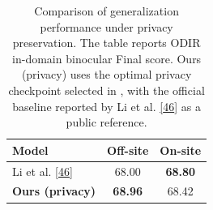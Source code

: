 \begin{table}[!htb]
\centering
\caption{Comparison of generalization performance under privacy preservation. The table reports ODIR in-domain binocular Final score. Ours (privacy) uses the optimal privacy checkpoint selected in , with the official baseline reported by Li et al. \hyperref[_Ref213949402]{{[}46{]}} as a public reference.}
\label{tab:privacy-final}
\begin{tabular}{lcc}
\toprule
Model & Off-site & On-site \\
\midrule
Li et al. \hyperref[_Ref213949402]{{[}46{]}} & 68.00 & \textbf{68.80} \\
\textbf{Ours (privacy)} & \textbf{68.96} & 68.42 \\
\bottomrule
\end{tabular}
\end{table}
